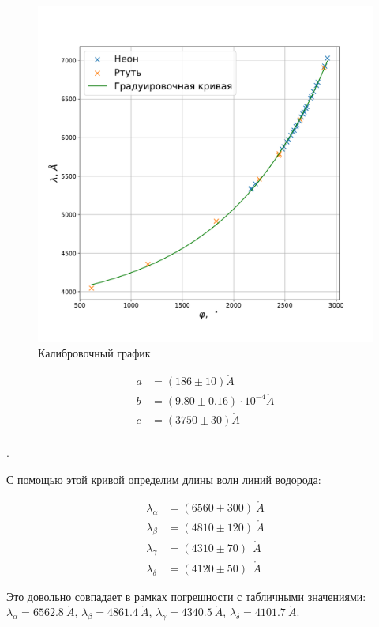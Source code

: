 \documentclass[a4paper, 12pt]{article}
\renewcommand{\AA}{\ensuremath{\mathring{A}}}
\newcounter{Points}
\newcommand{\point}{\arabic{Points}. \addtocounter{Points}{1}}
\begin{document}
\begin{figure}[!h]
    \includegraphics[scale = 0.35]{calib}
    \centering
    \caption{Калибровочный график}
    \label{img:calib}
\end{figure}

\begin{align*}
    a &= (186 \pm 10) \AA \\
    b &= (9.80 \pm 0.16) \cdot 10^{-4} \AA \\
    c &= (3750 \pm 30) \AA \\
\end{align*}

\point С помощью этой кривой определим длины волн линий водорода:

\begin{align*}
    \lambda_\alpha &= (6560 \pm 300) ~ \AA \\
    \lambda_\beta  &= (4810 \pm 120) ~ \AA \\
    \lambda_\gamma &= (4310 \pm 70)  ~~ \AA \\
    \lambda_\delta &= (4120 \pm 50)  ~~ \AA
\end{align*}

Это довольно совпадает в рамках погрешности с табличными значениями: $\lambda_\alpha = 6562.8 ~ \AA$, $\lambda_\beta = 4861.4 ~ \AA$, $\lambda_\gamma = 4340.5 ~ \AA$, $\lambda_\delta = 4101.7 ~ \AA$.
\end{document}
